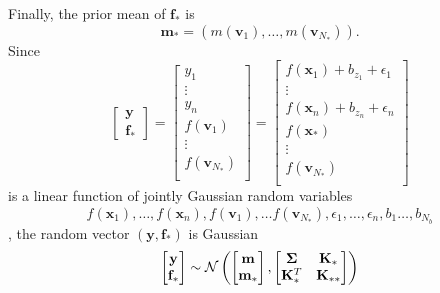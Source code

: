Finally, the prior mean of $\mathbf{f}_*$ is
\begin{equation*}
    \mathbf{m}_* = (m(\mathbf{v}_1), \dots, m(\mathbf{v}_{N_*})).
\end{equation*}
Since
\begin{equation*}
    \begin{bmatrix}
        \mathbf{y} \\
        \mathbf{f}_{*}
    \end{bmatrix}
    =
    \begin{bmatrix}
        y_1 \\
        \vdots \\
        y_n \\
        f(\mathbf{v}_1) \\
        \vdots \\
        f(\mathbf{v}_{N_{*}}) \\
    \end{bmatrix}
    =
    \begin{bmatrix}
        f(\mathbf{x}_1) + b_{z_1} + \epsilon_1 \\
        \vdots \\
        f(\mathbf{x}_n) + b_{z_n} + \epsilon_n \\
        f(\mathbf{x}_*) \\
        \vdots \\
        f(\mathbf{v}_{N_{*}}) \\
    \end{bmatrix}
\end{equation*}
is a linear function of jointly Gaussian random variables
\begin{equation*}
    f(\mathbf{x}_1), \dots, f(\mathbf{x}_n), f(\mathbf{v}_1), \dots f(\mathbf{v}_{N_*}), \epsilon_1, \dots, \epsilon_n, b_1 \dots, b_{N_b}
\end{equation*}
,
the random vector $(\mathbf{y}, \mathbf{f}_*)$ is Gaussian
\begin{equation*}
    \begin{bmatrix}
        \mathbf{y} \\
        \mathbf{f}_*
    \end{bmatrix}
    \sim
    \mathcal{N}\left(
    \begin{bmatrix}
            \mathbf{m} \\
            \mathbf{m}_*
        \end{bmatrix}
    ,
    \begin{bmatrix}
            \boldsymbol{\Sigma} & \mathbf{K}_* \\
            \mathbf{K}_*^T & \mathbf{K}_{* *}
        \end{bmatrix}
    \right)
\end{equation*}
